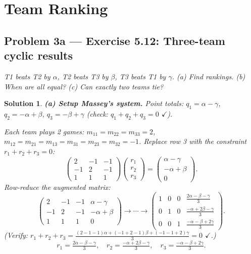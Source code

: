 \documentclass[11pt,a4paper]{article}
\theoremstyle{sol}
\newtheorem*{solution}{Solution}
\begin{document}
\clearpage
\section{Team Ranking}

\subsection*{Problem 3a --- Exercise 5.12: Three-team cyclic results}
\textit{T1 beats T2 by $\alpha$, T2 beats T3 by $\beta$, T3 beats T1 by $\gamma$.
(a) Find rankings. (b) When are all equal? (c) Can exactly two teams tie?}

\begin{solution}
\textbf{(a) Setup Massey's system.}
Point totals: $q_1=\alpha-\gamma$, $q_2=-\alpha+\beta$, $q_3=-\beta+\gamma$ (check: $q_1+q_2+q_3=0$ $\checkmark$).

Each team plays 2 games: $m_{11}=m_{22}=m_{33}=2$, $m_{12}=m_{21}=m_{13}=m_{31}=m_{23}=m_{32}=-1$.
Replace row 3 with the constraint $r_1+r_2+r_3=0$:
\[
\begin{pmatrix}2&-1&-1\\-1&2&-1\\1&1&1\end{pmatrix}
\begin{pmatrix}r_1\\r_2\\r_3\end{pmatrix}=\begin{pmatrix}\alpha-\gamma\\-\alpha+\beta\\0\end{pmatrix}.
\]
Row-reduce the augmented matrix:
\[
\begin{pmatrix}2&-1&-1&\alpha-\gamma\\-1&2&-1&-\alpha+\beta\\1&1&1&0\end{pmatrix}
\to\cdots\to
\begin{pmatrix}1&0&0&\frac{2\alpha-\beta-\gamma}{3}\\0&1&0&\frac{-\alpha+2\beta-\gamma}{3}\\0&0&1&\frac{-\alpha-\beta+2\gamma}{3}\end{pmatrix}.
\]
(Verify: $r_1+r_2+r_3=\frac{(2-1-1)\alpha+(-1+2-1)\beta+(-1-1+2)\gamma}{3}=0$ $\checkmark$.)
\[
\boxed{r_1=\tfrac{2\alpha-\beta-\gamma}{3},\quad r_2=\tfrac{-\alpha+2\beta-\gamma}{3},\quad r_3=\tfrac{-\alpha-\beta+2\gamma}{3}.}
\]


\end{solution}
\end{document}
